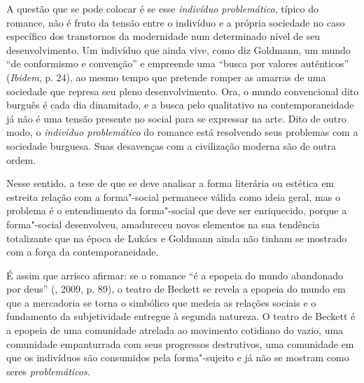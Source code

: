 A questão que se pode colocar é se esse \emph{indivíduo problemático},
típico do romance, não é fruto da tensão entre o indivíduo e a própria
sociedade no caso específico dos transtornos da modernidade num
determinado nível de seu desenvolvimento. Um indivíduo que ainda vive,
como diz Goldmann, um mundo ``de conformismo e convenção'' e empreende
uma ``busca por valores autênticos'' (\emph{Ibidem}, p. 24), ao mesmo
tempo que pretende romper as amarras de uma sociedade que represa seu
pleno desenvolvimento. Ora, o mundo convencional dito burguês é cada dia
dinamitado, e a busca pelo qualitativo na contemporaneidade já não é uma
tensão presente no social para se expressar na arte. Dito de outro modo,
o \emph{indivíduo problemático} do romance está resolvendo seus
problemas com a sociedade burguesa. Suas desavenças com a civilização moderna são de outra ordem.

Nesse sentido, a tese de que se deve analisar a forma literária ou
estética em estreita relação com a forma"-social permanece válida como
ideia geral, mas o problema é o entendimento da forma"-social que deve
ser enriquecido, porque a forma"-social desenvolveu, amadureceu novos
elementos na sua tendência totalizante que na época de Lukács e
Goldmann ainda não tinham se mostrado com a força da contemporaneidade.

É assim que arrisco afirmar: se o romance ``é a epopeia do mundo
abandonado por deus'' (, 2009, p. 89), o teatro de Beckett se
revela a epopeia do mundo em que a mercadoria se torna o simbólico que
medeia as relações sociais e o fundamento da subjetividade entregue à
segunda natureza. O teatro de Beckett é a epopeia de uma comunidade
atrelada ao movimento cotidiano do vazio, uma comunidade empanturrada
com seus progressos destrutivos, uma comunidade em que os indivíduos são
consumidos pela forma"-sujeito e já não se mostram como seres
\emph{problemáticos.}

